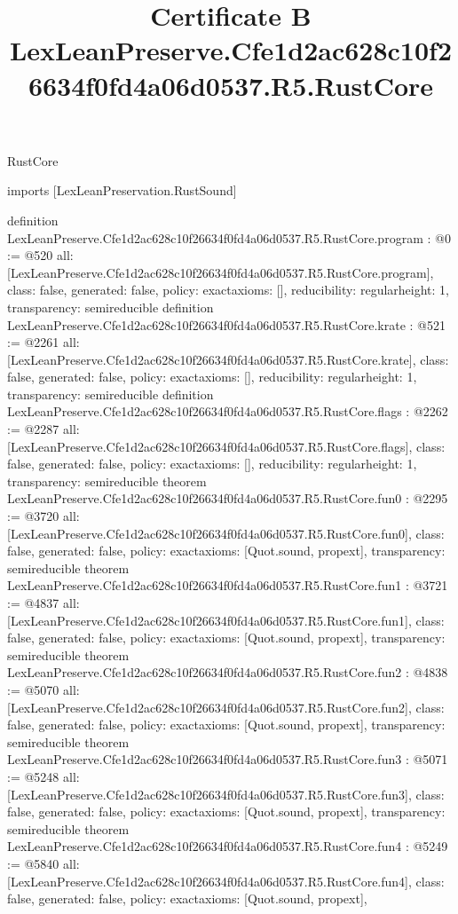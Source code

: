 \begin{lexlean}{RustCore}
\title{Certificate B LexLeanPreserve.Cfe1d2ac628c10f26634f0fd4a06d0537.R5.RustCore}
\begin{coremodule}
imports [LexLeanPreservation.RustSound]

definition LexLeanPreserve.Cfe1d2ac628c10f26634f0fd4a06d0537.R5.RustCore.program : @0 := @520 {
  all: [LexLeanPreserve.Cfe1d2ac628c10f26634f0fd4a06d0537.R5.RustCore.program],
  class: false,
  generated: false,
  policy: exact{axioms: []},
  reducibility: regular{height: 1},
  transparency: semireducible
}
definition LexLeanPreserve.Cfe1d2ac628c10f26634f0fd4a06d0537.R5.RustCore.krate : @521 := @2261 {
  all: [LexLeanPreserve.Cfe1d2ac628c10f26634f0fd4a06d0537.R5.RustCore.krate],
  class: false,
  generated: false,
  policy: exact{axioms: []},
  reducibility: regular{height: 1},
  transparency: semireducible
}
definition LexLeanPreserve.Cfe1d2ac628c10f26634f0fd4a06d0537.R5.RustCore.flags : @2262 := @2287 {
  all: [LexLeanPreserve.Cfe1d2ac628c10f26634f0fd4a06d0537.R5.RustCore.flags],
  class: false,
  generated: false,
  policy: exact{axioms: []},
  reducibility: regular{height: 1},
  transparency: semireducible
}
theorem LexLeanPreserve.Cfe1d2ac628c10f26634f0fd4a06d0537.R5.RustCore.fun0 : @2295 := @3720 {
  all: [LexLeanPreserve.Cfe1d2ac628c10f26634f0fd4a06d0537.R5.RustCore.fun0],
  class: false,
  generated: false,
  policy: exact{axioms: [Quot.sound, propext]},
  transparency: semireducible
}
theorem LexLeanPreserve.Cfe1d2ac628c10f26634f0fd4a06d0537.R5.RustCore.fun1 : @3721 := @4837 {
  all: [LexLeanPreserve.Cfe1d2ac628c10f26634f0fd4a06d0537.R5.RustCore.fun1],
  class: false,
  generated: false,
  policy: exact{axioms: [Quot.sound, propext]},
  transparency: semireducible
}
theorem LexLeanPreserve.Cfe1d2ac628c10f26634f0fd4a06d0537.R5.RustCore.fun2 : @4838 := @5070 {
  all: [LexLeanPreserve.Cfe1d2ac628c10f26634f0fd4a06d0537.R5.RustCore.fun2],
  class: false,
  generated: false,
  policy: exact{axioms: [Quot.sound, propext]},
  transparency: semireducible
}
theorem LexLeanPreserve.Cfe1d2ac628c10f26634f0fd4a06d0537.R5.RustCore.fun3 : @5071 := @5248 {
  all: [LexLeanPreserve.Cfe1d2ac628c10f26634f0fd4a06d0537.R5.RustCore.fun3],
  class: false,
  generated: false,
  policy: exact{axioms: [Quot.sound, propext]},
  transparency: semireducible
}
theorem LexLeanPreserve.Cfe1d2ac628c10f26634f0fd4a06d0537.R5.RustCore.fun4 : @5249 := @5840 {
  all: [LexLeanPreserve.Cfe1d2ac628c10f26634f0fd4a06d0537.R5.RustCore.fun4],
  class: false,
  generated: false,
  policy: exact{axioms: [Quot.sound, propext]},
}
\end{coremodule}
\end{lexlean}
